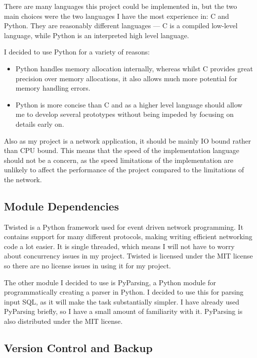 \documentclass[12pt,twoside,notitlepage]{report}
\begin{document}
There are many languages this project could be implemented in, but the two main choices were the
two languages I have the most experience in: C and Python. They are reasonably different languages
--- C is a compiled low-level language, while Python is an interpreted high level language.

I decided to use Python for a variety of reasons:
\begin{itemize}
\item Python handles memory allocation internally, whereas whilst C provides great precision over memory
allocations, it also allows much more potential for memory handling errors.
\item Python is more concise than C and as a higher level language should allow me to develop several
prototypes without being impeded by focusing on details early on.
\end{itemize}

Also as my project is a network application, it should be mainly IO bound rather than CPU bound.
This means that the speed of the implementation language should not be a concern, as the speed
limitations of the implementation are unlikely to affect the performance of the project compared
to the limitations of the network.

\subsection{Module Dependencies}

Twisted is a Python framework used for event driven network programming. It contains support for
many different protocols, making writing efficient networking code a lot easier.  It is single
threaded, which means I will not have to worry about concurrency issues in my project. Twisted is
licensed under the MIT license so there are no license issues in using it for my project.

The other module I decided to use is PyParsing, a Python module for programmatically creating a
parser in Python. I decided to use this for parsing input SQL, as it will make the task
substantially simpler. I have already used PyParsing briefly, so I have a small amount of
familiarity with it. PyParsing is also distributed under the MIT license.

\subsection{Version Control and Backup}
\end{document}
